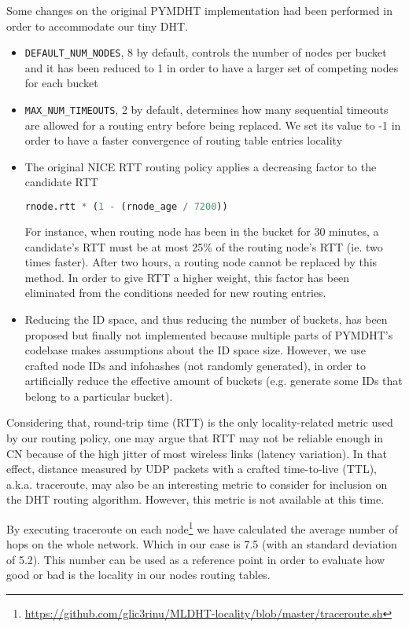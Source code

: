 \documentclass[conference]{IEEEtran}
\begin{document}
Some changes on the original PYMDHT implementation had been performed in order to accommodate our tiny DHT.
\begin{itemize}
\item \texttt{DEFAULT\_NUM\_NODES}, 8 by default, controls the number of nodes per bucket and it has been reduced to 1 in order to have a larger set of competing nodes for each bucket
\item \texttt{MAX\_NUM\_TIMEOUTS}, 2 by default, determines how many sequential timeouts are allowed for a routing entry before being replaced. We set its value to -1 in order to have a faster convergence of routing table entries locality
\item  The original NICE RTT routing policy applies a decreasing factor to the candidate RTT

\begin{lstlisting}[language=python]
rnode.rtt * (1 - (rnode_age / 7200))
\end{lstlisting}

For instance, when routing node has been in the bucket for 30 minutes, a candidate's RTT must be at most 25\% of the routing node's RTT (ie. two times faster). After two hours, a routing node cannot be replaced by this method. In order to give RTT a higher weight, this factor has been eliminated from the conditions needed for new routing entries.
\item  Reducing the ID space, and thus reducing the number of buckets, has been proposed but finally not implemented because multiple parts of PYMDHT's codebase makes assumptions about the ID space size. However, we use crafted node IDs and infohashes (not randomly generated), in order to artificially reduce the effective amount of buckets (e.g. generate some IDs that belong to a particular bucket).
\end{itemize}

Considering that, round-trip time (RTT) is the only locality-related metric used by our routing policy, one may argue that RTT may not be reliable enough in CN because of the high jitter of most wireless links (latency variation). In that effect, distance measured by UDP packets with a crafted time-to-live (TTL), a.k.a. traceroute, may also be an interesting metric to consider for inclusion on the DHT routing algorithm. However, this metric is not available at this time.

By executing traceroute on each node\footnote{\url{https://github.com/glic3rinu/MLDHT-locality/blob/master/traceroute.sh}} we have calculated the average number of hops on the whole network. Which in our case is 7.5 (with an standard deviation of 5.2). This number can be used as a reference point in order to evaluate how good or bad is the locality in our nodes routing tables.
\end{document}

